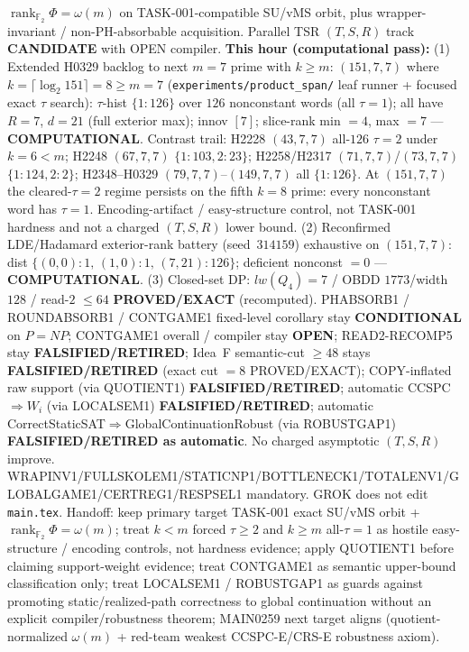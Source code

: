 \documentclass[11pt]{article}
\begin{document}
$\operatorname{rank}_{\mathbb F_2}\Phi=\omega(m)$ on TASK-001-compatible SU/vMS orbit,
plus wrapper-invariant / non-PH-absorbable acquisition.
Parallel TSR $(T,S,R)$ track \textbf{CANDIDATE} with OPEN compiler.
\textbf{This hour (computational pass):}
(1) Extended H0329 backlog to next $m{=}7$ prime with $k{\ge}m$:
$(151,7,7)$ where $k=\lceil\log_2 151\rceil=8{\ge}m{=}7$
(\texttt{experiments/product\_span/} leaf runner + focused exact $\tau$ search):
$\tau$-hist $\{1{:}126\}$ over $126$ nonconstant words (all $\tau{=}1$);
all have $R{=}7$, $d{=}21$ (full exterior max); innov $[7]$;
slice-rank min $=4$, max $=7$ --- \textbf{COMPUTATIONAL}.
Contrast trail: H2228 $(43,7,7)$ all-$126$ $\tau{=}2$ under $k{=}6{<}m$;
H2248 $(67,7,7)$ $\{1{:}103,2{:}23\}$; H2258/H2317 $(71,7,7)$/$(73,7,7)$ $\{1{:}124,2{:}2\}$;
H2348--H0329 $(79,7,7)$--$(149,7,7)$ all $\{1{:}126\}$.
At $(151,7,7)$ the cleared-$\tau{=}2$ regime persists on the fifth $k{=}8$ prime:
every nonconstant word has $\tau{=}1$. Encoding-artifact / easy-structure control,
not TASK-001 hardness and not a charged $(T,S,R)$ lower bound.
(2) Reconfirmed LDE/Hadamard exterior-rank battery (seed~$314159$) exhaustive on
$(151,7,7)$: dist $\{(0,0){:}1,\,(1,0){:}1,\,(7,21){:}126\}$; deficient nonconst $=0$ ---
\textbf{COMPUTATIONAL}.
(3) Closed-set DP: $lw(Q_4)=7$ / OBDD $1773$/width $128$ / read-$2$ $\le64$
\textbf{PROVED/EXACT} (recomputed).
PHABSORB1 / ROUNDABSORB1 / CONTGAME1 fixed-level corollary stay \textbf{CONDITIONAL} on $P=NP$;
CONTGAME1 overall / compiler stay \textbf{OPEN}; READ2-RECOMP5 stay \textbf{FALSIFIED/RETIRED};
Idea~F semantic-cut $\ge48$ stays \textbf{FALSIFIED/RETIRED} (exact cut $=8$ PROVED/EXACT);
COPY-inflated raw support (via QUOTIENT1) \textbf{FALSIFIED/RETIRED};
automatic CCSPC$\Rightarrow W_i$ (via LOCALSEM1) \textbf{FALSIFIED/RETIRED};
automatic CorrectStaticSAT$\Rightarrow$GlobalContinuationRobust (via ROBUSTGAP1)
\textbf{FALSIFIED/RETIRED as automatic}.
No charged asymptotic $(T,S,R)$ improve.
WRAPINV1/FULLSKOLEM1/STATICNP1/BOTTLENECK1/TOTALENV1/GLOBALGAME1/CERTREG1/RESPSEL1 mandatory.
GROK does not edit \texttt{main.tex}.
Handoff: keep primary target TASK-001 exact SU/vMS orbit + $\operatorname{rank}_{\mathbb F_2}\Phi=\omega(m)$;
treat $k{<}m$ forced $\tau{\ge}2$ and $k{\ge}m$ all-$\tau{=}1$ as hostile easy-structure /
encoding controls, not hardness evidence; apply QUOTIENT1 before claiming support-weight
evidence; treat CONTGAME1 as semantic upper-bound classification only; treat LOCALSEM1 /
ROBUSTGAP1 as guards against promoting static/realized-path correctness to global
continuation without an explicit compiler/robustness theorem; MAIN0259 next target
aligns (quotient-normalized $\omega(m)$ + red-team weakest CCSPC-E/CRS-E robustness axiom).
\end{document}
